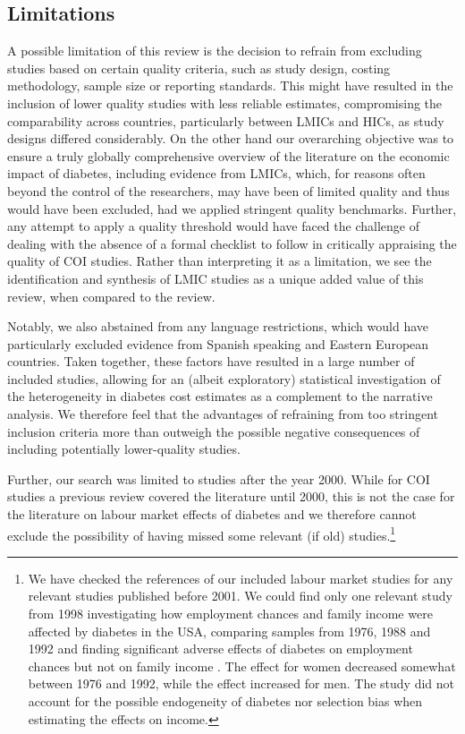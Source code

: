 \documentclass[12pt,english]{article}
\begin{document}
\subsection{Limitations }
A possible limitation of this review is the decision to refrain from excluding studies based on certain quality criteria, such as study design, costing methodology, sample size or reporting standards. This might have resulted in the inclusion of lower quality studies with less reliable estimates, compromising the comparability across countries, particularly between \acp{LMIC} and \acp{HIC}, as study designs differed considerably. On the other hand our overarching objective was to ensure a truly globally comprehensive overview of the literature on the economic impact of diabetes, including evidence from \acp{LMIC}, which, for reasons often beyond the control of the researchers, may have been of limited quality and thus would have been excluded, had we applied stringent quality benchmarks. Further, any attempt to apply a quality threshold would have faced the challenge of dealing with the absence of a formal checklist to follow in critically appraising the quality of \ac{COI} studies. Rather than interpreting it as a limitation, we see the identification and synthesis of \ac{LMIC} studies as a unique added value of this review, when compared to the \textcite{Ettaro2004} review. 

Notably, we also abstained from any language restrictions, which would have particularly excluded evidence from Spanish speaking and Eastern European countries. Taken together, these factors have resulted in a large number of included studies, allowing for an (albeit exploratory) statistical investigation of the heterogeneity in diabetes cost estimates as a complement to the narrative analysis. We therefore feel that the advantages of refraining from too stringent inclusion criteria more than outweigh the possible negative consequences of including potentially lower-quality studies.

Further, our search was limited to studies after the year 2000. While for \ac{COI} studies a previous review covered the literature until 2000, this is not the case for the literature on labour market effects of diabetes and we therefore cannot exclude the possibility of having missed some relevant (if old) studies.\footnote{We have checked the references of our included labour market
studies for any relevant studies published before 2001. We could find only one relevant study from 1998 investigating how employment
chances and family income were affected by diabetes in the USA, comparing samples from 1976, 1988 and 1992 and finding significant
adverse effects of diabetes on employment chances but not on family income \parencite{Kahn1998b}. The effect for women decreased somewhat between 1976 and 1992, while the effect increased for men. The study did not account for the possible endogeneity of diabetes nor selection bias when estimating the effects on income.}
\end{document}
